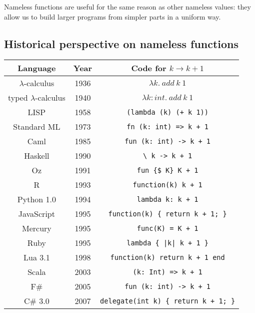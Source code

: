 Nameless functions are useful for the same reason as other nameless
values: they allow us to build larger programs from simpler parts
in a uniform way.

\subsection{Historical perspective on nameless functions}

\begin{wraptable}{r}{0.6\columnwidth}%
\begin{centering}
\vspace{-1\baselineskip}
\begin{tabular}{|c|c|c|}
\hline 
\textbf{\small{}Language} & \textbf{\small{}Year} & \textbf{\small{}Code for }{\small{}$k\rightarrow k+1$}\tabularnewline
\hline 
\hline 
{\footnotesize{}$\lambda$-calculus} & {\footnotesize{}1936} & $\lambda k.~add~k~1$\tabularnewline
\hline 
{\footnotesize{}typed $\lambda$-calculus} & {\footnotesize{}1940} & $\lambda k:int.~add~k~1$\tabularnewline
\hline 
{\footnotesize{}LISP} & {\footnotesize{}1958} & \texttt{\footnotesize{}}\lstinline!(lambda (k) (+ k 1))!\tabularnewline
\hline 
{\footnotesize{}Standard ML} & {\footnotesize{}1973} & \texttt{\footnotesize{}}\lstinline!fn (k: int) => k + 1!\tabularnewline
\hline 
{\footnotesize{}Caml} & {\footnotesize{}1985} & \lstinline!fun (k: int) -> k + 1!\tabularnewline
\hline 
{\footnotesize{}Haskell} & {\footnotesize{}1990} & \lstinline!\ k -> k + 1!\tabularnewline
\hline 
{\footnotesize{}Oz} & {\footnotesize{}1991} & \lstinline!fun {$ K} K + 1!\tabularnewline
\hline 
{\footnotesize{}R} & {\footnotesize{}1993} & \lstinline!function(k) k + 1!\tabularnewline
\hline 
{\footnotesize{}Python 1.0} & {\footnotesize{}1994} & \lstinline!lambda k: k + 1!\tabularnewline
\hline 
{\footnotesize{}JavaScript} & {\footnotesize{}1995} & \lstinline!function(k) { return k + 1; }!\tabularnewline
\hline 
{\footnotesize{}Mercury} & {\footnotesize{}1995} & \lstinline!func(K) = K + 1!\tabularnewline
\hline 
{\footnotesize{}Ruby} & {\footnotesize{}1995} & \lstinline!lambda { |k| k + 1 }!\tabularnewline
\hline 
{\footnotesize{}Lua 3.1} & {\footnotesize{}1998} & \lstinline!function(k) return k + 1 end!\tabularnewline
\hline 
{\footnotesize{}Scala} & {\footnotesize{}2003} & \lstinline!(k: Int) => k + 1!\tabularnewline
\hline 
{\footnotesize{}F\#} & {\footnotesize{}2005} & \lstinline!fun (k: int) -> k + 1!\tabularnewline
\hline 
{\footnotesize{}C\# 3.0} & {\footnotesize{}2007} & \lstinline!delegate(int k) { return k + 1; }!\tabularnewline

\end{tabular}
\end{centering}
\end{wraptable}
